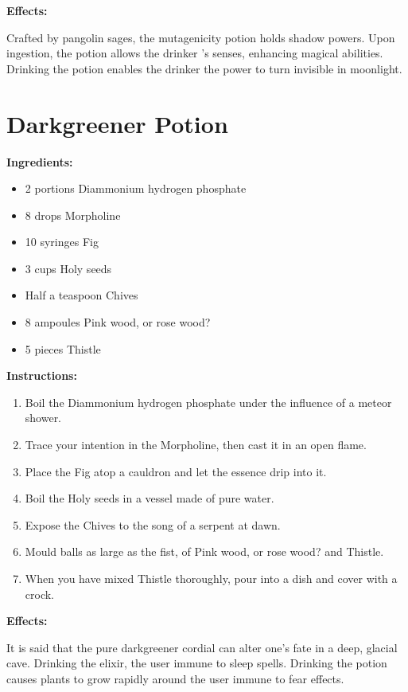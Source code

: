 \documentclass{article}
\begin{document}
\textbf{Effects:}

Crafted by pangolin sages, the mutagenicity potion holds shadow powers. Upon ingestion, the potion allows the drinker 's senses, enhancing magical abilities. Drinking the potion enables the drinker the power to turn invisible in moonlight.

\newpage
\section*{Darkgreener Potion}

\textbf{Ingredients:}

\begin{itemize}
  \item 2 portions Diammonium hydrogen phosphate
  \item 8 drops Morpholine
  \item 10 syringes Fig
  \item 3 cups Holy seeds
  \item Half a teaspoon Chives
  \item 8 ampoules Pink wood, or rose wood?
  \item 5 pieces Thistle
\end{itemize}

\textbf{Instructions:}

\begin{enumerate}
  \item Boil the Diammonium hydrogen phosphate under the influence of a meteor shower.
  \item Trace your intention in the Morpholine, then cast it in an open flame.
  \item Place the Fig atop a cauldron and let the essence drip into it.
  \item Boil the Holy seeds in a vessel made of pure water.
  \item Expose the Chives to the song of a serpent at dawn.
  \item Mould balls as large as the fist, of Pink wood, or rose wood? and Thistle.
  \item When you have mixed Thistle thoroughly, pour into a dish and cover with a crock.
\end{enumerate}

\textbf{Effects:}

It is said that the pure darkgreener cordial can alter one's fate in a deep, glacial cave. Drinking the elixir, the user immune to sleep spells. Drinking the potion causes plants to grow rapidly around the user immune to fear effects.
\end{document}
